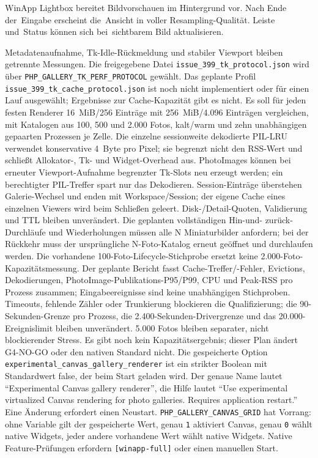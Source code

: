 \documentclass[11pt,a4paper]{article}
\newcommand{\codeword}[1]{\nolinkurl{#1}}
\begin{document}
WinApp Lightbox bereitet Bildvorschauen im Hintergrund vor. Nach
Ende der~Eingabe erscheint die~Ansicht in voller Resampling-Qualität.
Leiste und~Status können sich bei~sichtbarem Bild aktualisieren.

Metadatenaufnahme, Tk-Idle-Rückmeldung
und stabiler Viewport bleiben getrennte Messungen. Die freigegebene Datei
\codeword{issue_399_tk_protocol.json} wird über
\codeword{PHP_GALLERY_TK_PERF_PROTOCOL} gewählt. Das geplante Profil \codeword{issue_399_tk_cache_protocol.json} ist noch
nicht implementiert oder für einen Lauf ausgewählt; Ergebnisse zur Cache-Kapazität
gibt es nicht. Es soll für jeden festen Renderer 16~MiB/256 Einträge mit
256~MiB/4.096 Einträgen vergleichen, mit Katalogen aus 100, 500 und 2.000 Fotos,
kalt/warm und zehn unabhängigen gepaarten Prozessen je Zelle. Die einzelne
sessionweite dekodierte PIL-LRU verwendet konservative 4~Byte pro Pixel; sie
begrenzt nicht den RSS-Wert und schließt Allokator-, Tk- und Widget-Overhead aus.
PhotoImages können bei erneuter Viewport-Aufnahme begrenzter Tk-Slots neu erzeugt
werden; ein berechtigter PIL-Treffer spart nur das Dekodieren. Session-Einträge
überstehen Galerie-Wechsel und enden mit Workspace/Session; der eigene Cache
eines einzelnen Viewers wird beim Schließen geleert. Disk-/Detail-Quoten,
Validierung und TTL bleiben unverändert. Die geplanten vollständigen Hin-und-
zurück-Durchläufe und Wiederholungen müssen alle N Miniaturbilder anfordern;
bei der Rückkehr muss der ursprüngliche N-Foto-Katalog erneut geöffnet und
durchlaufen werden. Die vorhandene 100-Foto-Lifecycle-Stichprobe ersetzt keine
2.000-Foto-Kapazitätsmessung. Der geplante Bericht fasst Cache-Treffer/-Fehler,
Evictions, Dekodierungen, PhotoImage-Publikations-P95/P99, CPU und Peak-RSS pro
Prozess zusammen; Eingabeereignisse sind keine unabhängigen Stichproben.
Timeouts, fehlende Zähler oder Trunkierung blockieren die Qualifizierung; die
90-Sekunden-Grenze pro Prozess, die 2.400-Sekunden-Drivergrenze und das
20.000-Ereignislimit bleiben unverändert. 5.000 Fotos bleiben separater,
nicht blockierender Stress. Es gibt noch kein Kapazitätsergebnis; dieser Plan
ändert G4-NO-GO oder den nativen Standard nicht. Die gespeicherte Option
\codeword{experimental_canvas_gallery_renderer} ist ein strikter Boolean mit Standardwert false, der beim Start geladen wird. Der genaue
Name lautet “Experimental Canvas gallery renderer”, die Hilfe lautet “Use
experimental virtualized Canvas rendering for photo galleries. Requires
application restart.” Eine Änderung erfordert einen Neustart.
\codeword{PHP_GALLERY_CANVAS_GRID} hat Vorrang: ohne Variable gilt der gespeicherte
Wert, genau \codeword{1} aktiviert Canvas, genau \codeword{0} wählt native
Widgets, jeder andere vorhandene Wert wählt native Widgets.
Native Feature-Prüfungen
erfordern \codeword{[winapp-full]} oder einen manuellen Start.
\end{document}
